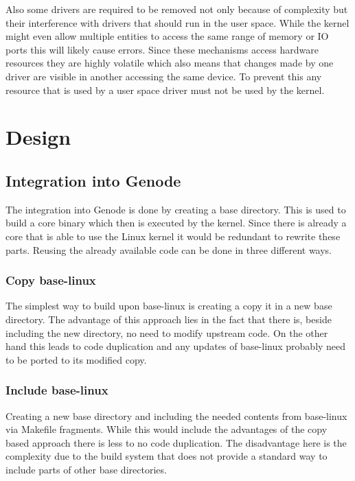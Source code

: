 \documentclass[
a4paper,
12pt,
notitlepage,
parskip=half,
DIV=11,
]{scrbook}
\begin{document}
		Also some drivers are required to be removed not only because of complexity but their interference with drivers that should run in the user space.
		While the kernel might even allow multiple entities to access the same range of memory or IO ports this will likely cause errors.
		Since these mechanisms access hardware resources they are highly volatile which also means that changes made by one driver are visible in another accessing the same device.
		To prevent this any resource that is used by a user space driver must not be used by the kernel.
	
	\chapter{Design}
	
		\section{Integration into Genode}
		The integration into Genode is done by creating a base directory.
		This is used to build a core binary which then is executed by the kernel.
		Since there is already a core that is able to use the Linux kernel it would be redundant to rewrite these parts.
		Reusing the already available code can be done in three different ways.
	
		\subsection{Copy base-linux}
		The simplest way to build upon base-linux is creating a copy it in a new base directory.
		The advantage of this approach lies in the fact that there is, beside including the new directory, no need to modify upstream code.
		On the other hand this leads to code duplication and any updates of base-linux probably need to be ported to its modified copy.
	
		\subsection{Include base-linux}
		Creating a new base directory and including the needed contents from base-linux via Makefile fragments.
		While this would include the advantages of the copy based approach there is less to no code duplication.
		The disadvantage here is the complexity due to the build system that does not provide a standard way to include parts of other base directories.
	
\end{document}
